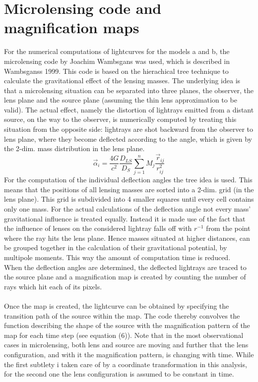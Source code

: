 \section{Microlensing code and magnification maps}
For the numerical computations of lightcurves for the models a and b, the microlensing code by Joachim Wambsgans was used, which is described in Wambsganss 1999. This code is based on the hierachical tree technique to calculate the gravitational effect of the lensing masses. The underlying idea is that a microlensing situation can be separated into three planes, the observer, the lens plane and the source plane (assuming the thin lens approximation to be valid). The actual effect, namely the distortion of lightrays emitted from a distant source, on the way to the observer, is numerically computed by treating this situation from the opposite side: lightrays are shot backward from the observer to lens plane, where they become deflected according to the angle, which is given by the 2-dim. mass distribution in the lens plane.
\begin{equation}
\vec{\alpha}_{i}=\frac{4G}{c^{2}} \frac{D_{LS}}{D_{S}}\sum_{j=1}^{n}M_j \frac{\vec{r}_{ij}}{r^2_{ij}} 
\end{equation}  
For the computation of the individual deflection angles the tree idea is used. This means that the positions of all lensing masses are sorted into a 2-dim. grid (in the lens plane). This grid is subdivided into 4 smaller squares until every cell contains only one mass. For the actual calculations of the deflection angle not every mass' gravitational influence is treated equally. Instead it is made use of the fact that the influence of lenses on the considered lightray falls off with $r^{-1}$ from the point where the ray hits the lens plane. Hence masses situated at higher distances, can be grouped together in the calculation of their gravitational potential, by multipole moments. This way the amount of computation time is reduced. \\
When the deflection angles are determined, the deflected lightrays are traced to the source plane and a magnification map is created by counting the number of rays which hit each of its pixels. \\\\
Once the map is created, the lightcurve can be obtained by specifying the transition path of the source within the map. The code thereby convolves the function describing the shape of the source with the magnification pattern of the map for each time step (see equation (6)). Note that in the most observational cases in microlensing, both lens and source are moving and further that the lens configuration, and with it the magnification pattern, is changing with time. While the first subtlety i taken care of by a coordinate transformation in this analysis, for the second one the lens configuration is assumed to be constant in time.  \\\\
